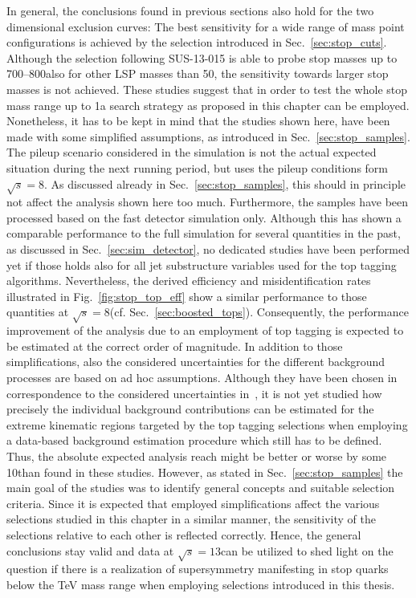 In general, the conclusions found in previous sections also hold for the two dimensional exclusion curves: The best sensitivity for a wide range of mass point configurations is achieved by the selection introduced in Sec.~\ref{sec:stop_cuts}. Although the selection following SUS-13-015 is able to probe stop masses up to 700--800\gev also for other LSP masses than 50\gev, the sensitivity towards larger stop masses is not achieved. These studies suggest that in order to test the whole stop mass range up to 1\tev a search strategy as proposed in this chapter can be employed. 
\\
Nonetheless, it has to be kept in mind that the studies shown here, have been made with some simplified assumptions, as introduced in Sec.~\ref{sec:stop_samples}. The pileup scenario considered in the simulation is not the actual expected situation during the next running period, but uses the pileup conditions form $\sqrt{s} = 8$\tev. As discussed already in Sec.~\ref{sec:stop_samples}, this should in principle not affect the analysis shown here too much. Furthermore, the samples have been processed based on the fast detector simulation only. Although this has shown a comparable performance to the full simulation for several quantities in the past, as discussed in Sec.~\ref{sec:sim_detector}, no dedicated studies have been performed yet if those holds also for all jet substructure variables used for the top tagging algorithms. Nevertheless, the derived efficiency and misidentification rates illustrated in Fig.~\ref{fig:stop_top_eff} show a similar performance to those quantities at $\sqrt{s} = 8$\tev (cf. Sec.~\ref{sec:boosted_tops}). Consequently, the performance improvement of the analysis due to an employment of top tagging is expected to be estimated at the correct order of magnitude. In addition to those simplifications, also the considered uncertainties for the different background processes are based on ad hoc assumptions. Although they have been chosen in correspondence to the considered uncertainties in~\cite{CMS-PAS-SUS-13-015}, it is not yet studied how precisely the individual background contributions can be estimated for the extreme kinematic regions targeted by the top tagging selections when employing a data-based background estimation procedure which still has to be defined. Thus, the absolute expected analysis reach might be better or worse by some 10\gev than found in these studies. However, as stated in Sec.~\ref{sec:stop_samples} the main goal of the studies was to identify general concepts and suitable selection criteria. Since it is expected that employed simplifications affect the various selections studied in this chapter in a similar manner, the sensitivity of the selections relative to each other is reflected correctly. Hence, the general conclusions stay valid and data at $\sqrt{s} = 13$\tev can be utilized to shed light on the question if there is a realization of supersymmetry manifesting in stop quarks below the TeV mass range when employing selections introduced in this thesis.  
